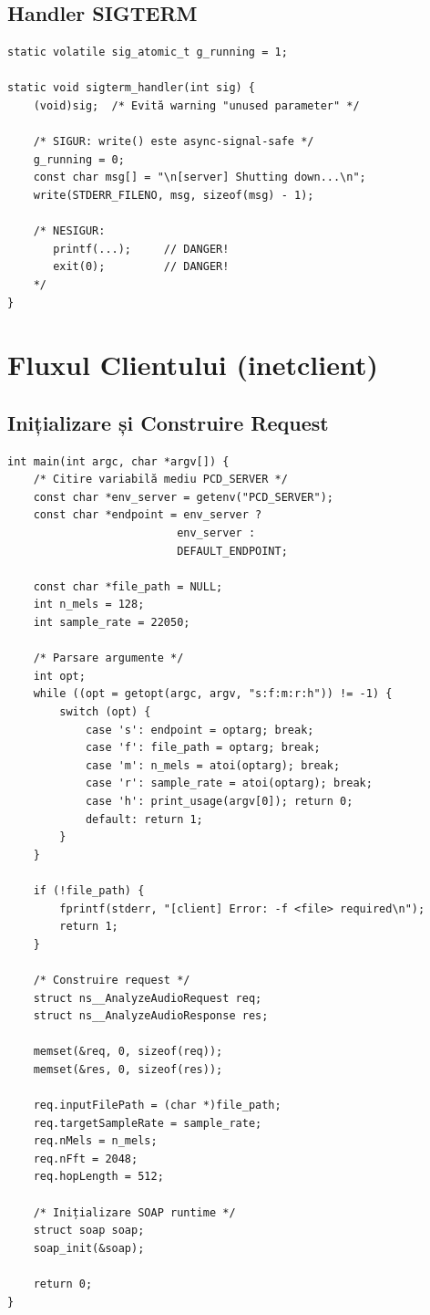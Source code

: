 \documentclass[12pt,a4paper,oneside]{book}
\begin{document}
\subsection{Handler SIGTERM}

\begin{lstlisting}[caption=Handler pentru shutdown]
static volatile sig_atomic_t g_running = 1;

static void sigterm_handler(int sig) {
    (void)sig;  /* Evită warning "unused parameter" */
    
    /* SIGUR: write() este async-signal-safe */
    g_running = 0;
    const char msg[] = "\n[server] Shutting down...\n";
    write(STDERR_FILENO, msg, sizeof(msg) - 1);
    
    /* NESIGUR:
       printf(...);     // DANGER!
       exit(0);         // DANGER!
    */
}
\end{lstlisting}

\section{Fluxul Clientului (inetclient)}

\subsection{Inițializare și Construire Request}

\begin{lstlisting}[caption=Inițializare client SOAP]
int main(int argc, char *argv[]) {
    /* Citire variabilă mediu PCD_SERVER */
    const char *env_server = getenv("PCD_SERVER");
    const char *endpoint = env_server ? 
                          env_server : 
                          DEFAULT_ENDPOINT;
    
    const char *file_path = NULL;
    int n_mels = 128;
    int sample_rate = 22050;
    
    /* Parsare argumente */
    int opt;
    while ((opt = getopt(argc, argv, "s:f:m:r:h")) != -1) {
        switch (opt) {
            case 's': endpoint = optarg; break;
            case 'f': file_path = optarg; break;
            case 'm': n_mels = atoi(optarg); break;
            case 'r': sample_rate = atoi(optarg); break;
            case 'h': print_usage(argv[0]); return 0;
            default: return 1;
        }
    }
    
    if (!file_path) {
        fprintf(stderr, "[client] Error: -f <file> required\n");
        return 1;
    }
    
    /* Construire request */
    struct ns__AnalyzeAudioRequest req;
    struct ns__AnalyzeAudioResponse res;
    
    memset(&req, 0, sizeof(req));
    memset(&res, 0, sizeof(res));
    
    req.inputFilePath = (char *)file_path;
    req.targetSampleRate = sample_rate;
    req.nMels = n_mels;
    req.nFft = 2048;
    req.hopLength = 512;
    
    /* Inițializare SOAP runtime */
    struct soap soap;
    soap_init(&soap);
    
    return 0;
}
\end{lstlisting}
\end{document}
